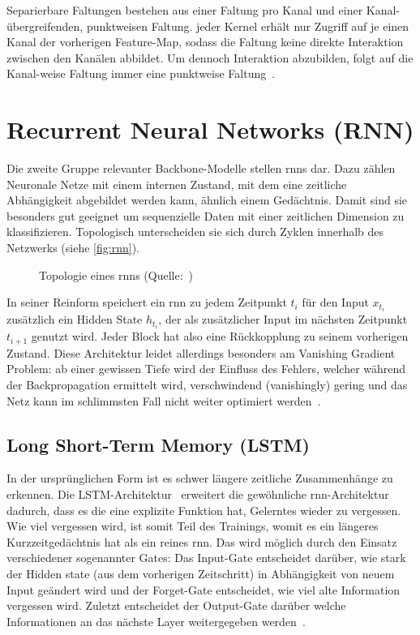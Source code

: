 Separierbare Faltungen bestehen aus einer Faltung pro Kanal und einer Kanal-übergreifenden, punktweisen Faltung.
\Dh jeder Kernel erhält nur Zugriff auf je einen Kanal der vorherigen Feature-Map, sodass die Faltung keine direkte Interaktion zwischen den Kanälen abbildet.
Um dennoch Interaktion abzubilden, folgt auf die Kanal-weise Faltung immer eine punktweise Faltung~\cite{Howard17}.

\section{Recurrent Neural Networks (RNN)}
\label{subsec:recurrent-neural-networks}

Die zweite Gruppe relevanter Backbone-Modelle stellen \glspl{rnn} dar.
Dazu zählen Neuronale Netze mit einem internen Zustand, mit dem eine zeitliche Abhängigkeit abgebildet werden kann, ähnlich einem Gedächtnis.
Damit sind sie besonders gut geeignet um sequenzielle Daten mit einer zeitlichen Dimension zu klassifizieren.
Topologisch unterscheiden sie sich durch Zyklen innerhalb des Netzwerks (siehe \autoref{fig:rnn}).

\begin{figure}[h!]
    \centering
    \caption[Topologie eines RNNs]{Topologie eines \glspl{rnn} (Quelle:~\cite{Veen17})}
    \label{fig:rnn}
\end{figure}

In seiner Reinform speichert ein \gls{rnn} zu jedem Zeitpunkt $t_i$ für den Input $x_{t_i}$ zusätzlich ein Hidden State $h_{t_i}$, der als zusätzlicher Input im nächsten Zeitpunkt $t_{i+1}$ genutzt wird.
Jeder Block hat also eine Rückkopplung zu seinem vorherigen Zustand.
Diese Architektur leidet allerdings besonders am Vanishing Gradient Problem:
ab einer gewissen Tiefe wird der Einfluss des Fehlers, welcher während der Backpropagation ermittelt wird, verschwindend (vanishingly) gering und das Netz kann im schlimmsten Fall nicht weiter optimiert werden~\cite{Pointer19}.

\subsection*{Long Short-Term Memory (LSTM)}

In der ursprünglichen Form ist es schwer längere zeitliche Zusammenhänge zu erkennen.
Die LSTM-Architektur~\cite{Hochreiter97} erweitert die gewöhnliche \gls{rnn}-Architektur dadurch, dass es die eine explizite Funktion hat, Gelerntes wieder zu vergessen.
Wie viel vergessen wird, ist somit Teil des Trainings, womit es ein längeres Kurzzeitgedächtnis hat als ein reines \gls{rnn}.
Das wird möglich durch den Einsatz verschiedener sogenannter Gates:
Das Input-Gate entscheidet darüber, wie stark der Hidden state (aus dem vorherigen Zeitschritt) in Abhängigkeit von neuem Input geändert wird und der Forget-Gate entscheidet, wie viel alte Information vergessen wird.
Zuletzt entscheidet der Output-Gate darüber welche Informationen an das nächste Layer weitergegeben werden~\cite{goodfellow16, Pointer19}.

